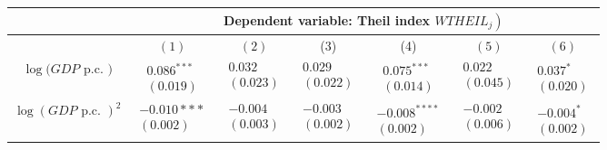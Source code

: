 \documentclass[10pt]{article}
\begin{document}
\begin{center}
\begin{tabular}{|c|c|c|c|c|c|c|}
\hline
 & \multicolumn{6}{|c|}{Dependent variable: Theil index $\left.W T H E I L_{j}\right)$} \\
\hline
 & $(1)$ & $(2)$ & (3) & (4) & $(5)$ & $(6)$ \\
\hline
$\log (G D P$ p.c. $)$ & $\begin{array}{l}0.086^{* * *} \\ (0.019)\end{array}$ & $\begin{array}{l}0.032 \\ (0.023)\end{array}$ & $\begin{array}{l}0.029 \\ (0.022)\end{array}$ & $\begin{array}{l}0.075^{* * *} \\ (0.014)\end{array}$ & $\begin{array}{l}0.022 \\ (0.045)\end{array}$ & $\begin{array}{l}0.037^{*} \\ (0.020)\end{array}$ \\
\hline
$\log (G D P \text { p.c. })^{2}$ & $\begin{array}{l}-0.010 * * * \\ (0.002)\end{array}$ & $\begin{array}{l}-0.004 \\ (0.003)\end{array}$ & $\begin{array}{l}-0.003 \\ (0.002)\end{array}$ & $\begin{array}{l}-0.008^{* * * *} \\ (0.002)\end{array}$ & $\begin{array}{l}-0.002 \\ (0.006)\end{array}$ & $\begin{array}{l}-0.004^{*} \\ (0.002)\end{array}$ \\
\hline

\end{tabular}
\end{center}
\end{document}
